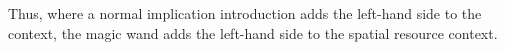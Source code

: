 \documentclass[thesis.tex]{subfiles}
\begin{document}
\begin{minipage}{0.4\textwidth}
  \begin{prooftree}
  \end{prooftree}
\end{minipage}
%
\begin{minipage}{0.4\textwidth}
  \begin{prooftree}
  \end{prooftree}
\end{minipage}

Thus, where a normal implication introduction adds the left-hand side to the \coq context, the magic wand adds the left-hand side to the spatial resource context.
\end{document}
